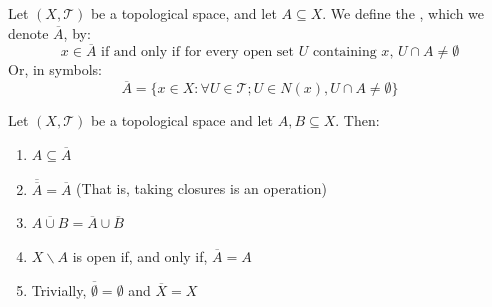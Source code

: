 \documentclass[12pt, a4paper, oneside, openright, titlepage]{book}
\begin{document}
\begin{definition}
    Let $(X,\mathcal{T})$ be a topological space, and let $A \subseteq X$. We define the , which we denote $\overline{A}$, by: \begin{equation*}
        x \in \overline{A}\text{ if and only if for every open set $U$ containing $x$, } U\cap A\neq \emptyset
    \end{equation*}
    Or, in symbols: \begin{equation*}
        \overline{A} = \{x \in X:\forall U\in\mathcal{T};U \in N(x), U\cap A\neq \emptyset\}
    \end{equation*}
\end{definition}


\begin{proposition}
    Let $(X,\mathcal{T})$ be a topological space and let $A,B\subseteq X$. Then:\begin{enumerate}
        \item $A\subseteq \overline{A}$
        \item $\overline{\overline{A}} = \overline{A}$ (That is, taking closures is an  operation)
        \item $\overline{A\cup B} = \overline{A}\cup\overline{B}$
        \item $X\backslash A$ is open if, and only if, $\overline{A} = A$
        \item Trivially, $\overline{\emptyset} = \emptyset$ and $\overline{X} = X$
    \end{enumerate}
\end{proposition}
\end{document}
